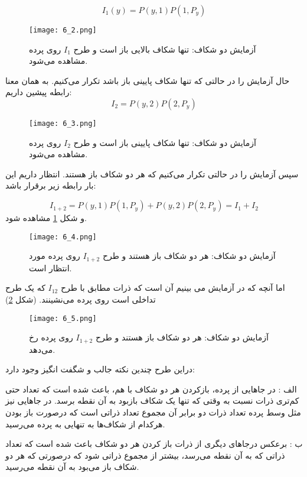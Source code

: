 \begin{equation}
	I_{1}(y) = P(y,1)P(1,P_{y})
\end{equation}

\begin{figure}[h]
	\caption{ آزمایش دو شکاف: تنها شکاف بالایی باز است و طرح $I_{1}$ روی پرده مشاهده می‌شود. }
	\centering
	\texttt{[image: 6\_2.png]}
\end{figure}
حال آزمایش را در حالتی که تنها شکاف پایینی باز باشد تکرار می‌کنیم. به همان معنا رابطه پیشین داریم: 
\begin{equation}
	I_{2} =  P(y,2)P(2,P_{y})
\end{equation}
\begin{figure}[h]
	\caption{ آزمایش دو شکاف: تنها شکاف پایینی باز است و طرح $I_{2}$ روی پرده مشاهده می‌شود. }
	\centering
	\texttt{[image: 6\_3.png]}
\end{figure}
سپس آزمایش را در حالتی تکرار می‌کنیم که هر دو شکاف باز هستند. انتظار داریم این بار رابطه زیر برقرار باشد:

\begin{equation}
	I_{1 + 2} =  P(y,1)P(1,P_{y}) + P(y,2)P(2,P_{y}) = I_{1} + I_{2}
\end{equation}
و شکل \ref{fig:1} مشاهده شود.
\begin{figure}[h]
	\caption{ آزمایش دو شکاف: هر دو شکاف باز هستند و طرح $I_{1+ 2}$ روی پرده مورد انتظار است.  }
	\centering
	\texttt{[image: 6\_4.png]}
	\label{fig:1}
\end{figure}

 


اما آنچه که در آزمایش می بینیم آن است که ذرات مطابق با طرح $I_{12}$ که یک طرح تداخلی است روی پرده می‌نشینند. (شکل \ref{fig:2})
\begin{figure}[h]
	\caption{ آزمایش دو شکاف: هر دو شکاف باز هستند و طرح $I_{1+ 2}$ روی پرده رخ می‌دهد.  }
	\centering
	\texttt{[image: 6\_5.png]}
	\label{fig:2}
\end{figure}

دراین طرح چندین نکته جالب و شگفت انگیز وجود دارد:

 

الف : در جاهایی از پرده، بازکردن هر دو شکاف با هم، باعث شده است که تعداد حتی کم‌تری ذرات نسبت به وقتی که تنها یک
شکاف بازبود به آن نقطه برسد. در جاهایی نیز مثل وسط پرده تعداد ذرات دو برابر آن مجموع تعداد ذراتی است که درصورت
باز بودن هرکدام از شکاف‌ها به تنهایی به پرده می‌رسید.

ب : برعکس درجاهای دیگری از ذرات باز کردن هر دو شکاف باعث شده است که تعداد ذراتی که به آن نقطه می‌رسد، بیشتر
از مجموع ذراتی شود که درصورتی که هر دو شکاف باز می‌بود به آن نقطه می‌رسید.

